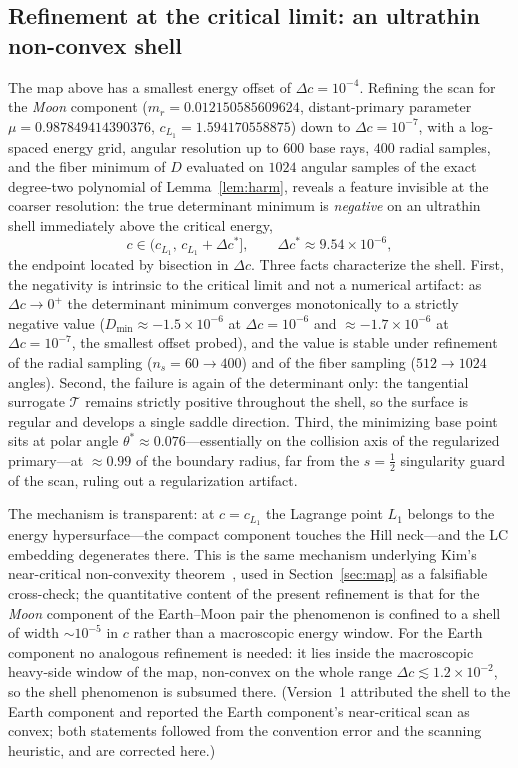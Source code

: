 \documentclass[11pt,reqno]{amsart}
\theoremstyle{plain}
\theoremstyle{definition}
\newcommand{\calT}{\mathcal{T}}
\begin{document}
\subsection{Refinement at the critical limit: an ultrathin non-convex shell}\label{subsec:shell}
The map above has a smallest energy offset of $\Delta c=10^{-4}$. Refining the scan for the \emph{Moon} component ($m_r=0.012150585609624$, distant-primary parameter $\mu=0.987849414390376$, $c_{L_1}=1.594170558875$) down to $\Delta c=10^{-7}$, with a log-spaced energy grid, angular resolution up to $600$ base rays, $400$ radial samples, and the fiber minimum of $D$ evaluated on $1024$ angular samples of the exact degree-two polynomial of Lemma~\ref{lem:harm}, reveals a feature invisible at the coarser resolution: the true determinant minimum is \emph{negative} on an ultrathin shell immediately above the critical energy,
\[
c\in\bigl(c_{L_1},\,c_{L_1}+\Delta c^*\bigr],\qquad \Delta c^*\approx 9.54\times 10^{-6},
\]
the endpoint located by bisection in $\Delta c$. Three facts characterize the shell. First, the negativity is intrinsic to the critical limit and not a numerical artifact: as $\Delta c\to 0^+$ the determinant minimum converges monotonically to a strictly negative value ($D_{\min}\approx -1.5\times 10^{-6}$ at $\Delta c=10^{-6}$ and $\approx -1.7\times 10^{-6}$ at $\Delta c=10^{-7}$, the smallest offset probed), and the value is stable under refinement of the radial sampling ($n_s=60\to 400$) and of the fiber sampling ($512\to 1024$ angles). Second, the failure is again of the determinant only: the tangential surrogate $\calT$ remains strictly positive throughout the shell, so the surface is regular and develops a single saddle direction. Third, the minimizing base point sits at polar angle $\theta^*\approx 0.076$---essentially on the collision axis of the regularized primary---at $\approx 0.99$ of the boundary radius, far from the $s=\tfrac12$ singularity guard of the scan, ruling out a regularization artifact.

The mechanism is transparent: at $c=c_{L_1}$ the Lagrange point $L_1$ belongs to the energy hypersurface---the compact component touches the Hill neck---and the LC embedding degenerates there. This is the same mechanism underlying Kim's near-critical non-convexity theorem~\cite[Thm.~1.3]{Kim}, used in Section~\ref{sec:map} as a falsifiable cross-check; the quantitative content of the present refinement is that for the \emph{Moon} component of the Earth--Moon pair the phenomenon is confined to a shell of width $\sim 10^{-5}$ in $c$ rather than a macroscopic energy window. For the Earth component no analogous refinement is needed: it lies inside the macroscopic heavy-side window of the map, non-convex on the whole range $\Delta c\lesssim 1.2\times 10^{-2}$, so the shell phenomenon is subsumed there. (Version~1 attributed the shell to the Earth component and reported the Earth component's near-critical scan as convex; both statements followed from the convention error and the scanning heuristic, and are corrected here.)
\end{document}
